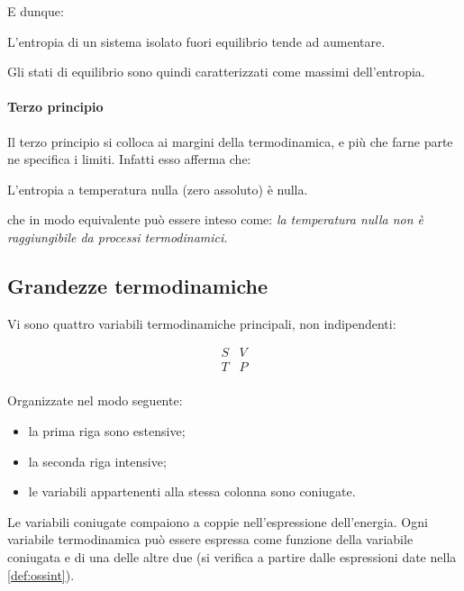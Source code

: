 \noindent E dunque:

\begin{defn}
	L'entropia di un sistema isolato fuori equilibrio tende ad aumentare.
\end{defn}

\noindent Gli stati di equilibrio sono quindi caratterizzati come massimi dell'entropia.

\paragraph{Terzo principio} Il terzo principio si colloca ai margini della termodinamica, e più che farne parte ne specifica i limiti. Infatti esso afferma che:

\begin{defn}
	L'entropia a temperatura nulla (zero assoluto) è nulla.
\end{defn}

\noindent che in modo equivalente può essere inteso come: \textit{la temperatura nulla non è raggiungibile da processi termodinamici.}

\subsection{Grandezze termodinamiche}
\label{sec:thermquant}

Vi sono quattro variabili termodinamiche principali, non indipendenti:

\begin{equation*}
\begin{matrix}
S	&	V \\
T	&	P \\
\end{matrix}
\end{equation*}

\noindent Organizzate nel modo seguente:
\begin{itemize}
	\item la prima riga sono estensive;
	\item la seconda riga intensive;
	\item le variabili appartenenti alla stessa colonna sono coniugate.
\end{itemize}

\noindent Le variabili coniugate compaiono a coppie nell'espressione dell'energia. Ogni variabile termodinamica può essere espressa come funzione della variabile coniugata e di una delle altre due (si verifica a partire dalle espressioni date nella \cref{def:ossint}).

